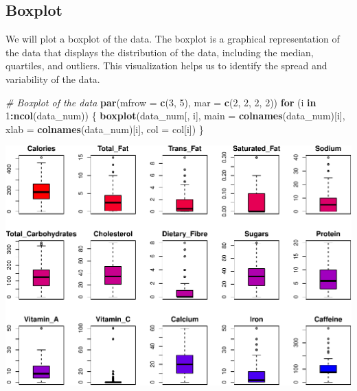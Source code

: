 \documentclass[
]{article}
\newenvironment{Shaded}{\begin{snugshade}}{\end{snugshade}}
\newcommand{\AttributeTok}[1]{\textcolor[rgb]{0.13,0.29,0.53}{#1}}
\newcommand{\CommentTok}[1]{\textcolor[rgb]{0.56,0.35,0.01}{\textit{#1}}}
\newcommand{\ControlFlowTok}[1]{\textcolor[rgb]{0.13,0.29,0.53}{\textbf{#1}}}
\newcommand{\DecValTok}[1]{\textcolor[rgb]{0.00,0.00,0.81}{#1}}
\newcommand{\FunctionTok}[1]{\textcolor[rgb]{0.13,0.29,0.53}{\textbf{#1}}}
\newcommand{\NormalTok}[1]{#1}
\newcommand{\SpecialCharTok}[1]{\textcolor[rgb]{0.81,0.36,0.00}{\textbf{#1}}}
\begin{document}
\subsection{Boxplot}\label{boxplot}

We will plot a boxplot of the data. The boxplot is a graphical
representation of the data that displays the distribution of the data,
including the median, quartiles, and outliers. This visualization helps
us to identify the spread and variability of the data.

\begin{Shaded}
\begin{Highlighting}[]
\CommentTok{\# Boxplot of the data}
\FunctionTok{par}\NormalTok{(}\AttributeTok{mfrow =} \FunctionTok{c}\NormalTok{(}\DecValTok{3}\NormalTok{, }\DecValTok{5}\NormalTok{), }\AttributeTok{mar =} \FunctionTok{c}\NormalTok{(}\DecValTok{2}\NormalTok{, }\DecValTok{2}\NormalTok{, }\DecValTok{2}\NormalTok{, }\DecValTok{2}\NormalTok{))}
\ControlFlowTok{for}\NormalTok{ (i }\ControlFlowTok{in} \DecValTok{1}\SpecialCharTok{:}\FunctionTok{ncol}\NormalTok{(data\_num)) \{}
  \FunctionTok{boxplot}\NormalTok{(data\_num[, i], }\AttributeTok{main =} \FunctionTok{colnames}\NormalTok{(data\_num)[i],}
          \AttributeTok{xlab =} \FunctionTok{colnames}\NormalTok{(data\_num)[i], }\AttributeTok{col =}\NormalTok{ col[i])}
\NormalTok{\}}
\end{Highlighting}
\end{Shaded}

\begin{center}\includegraphics{Statistical_Learning_Final_Report_files/figure-latex/boxplot-1} \end{center}
\end{document}
